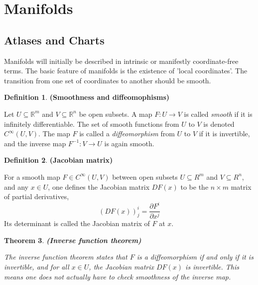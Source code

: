 \documentclass{article}
\newtheorem{theorem}{Theorem}[section]
\theoremstyle{definition}
\newtheorem{defn}[theorem]{Definition}
\newenvironment{definition}
  {\vspace{8pt}\begin{mdframed}[backgroundcolor=blueish]\begin{defn}}
  {\end{defn}\end{mdframed}\vspace{4pt}}
\begin{document}
\section{Manifolds}
\subsection{Atlases and Charts}

Manifolds will initially be described in intrinsic or manifestly  coordinate-free terms. The basic feature of manifolds is the existence of 'local coordinates'. The transition from one set of coordinates to another should be smooth.
\begin{definition} \textbf{(Smoothness and diffeomophisms)}

Let $U \subseteq \mathbb R^m$ and $V \subseteq \mathbb R^n$ be open subsets. A map $F : U \rightarrow V$ is called \textit{smooth} if it is infinitely differentiable. The set of smooth functions from $U$ to $V$ is denoted $C^{\infty}(U,V)$. The map $F$ is called a \textit{diffeomorphism} from $U$ to $V$ if it is invertible, and the inverse map $F^{-1}: V \rightarrow U$ is again smooth.
\end{definition}


\begin{definition} \textbf{(Jacobian matrix)}

For a smooth map $F \in C^{\infty}(U,V)$ between open subsets $U \subseteq R^m$ and $V \subseteq R^n$, and any $x \in U$, one defines the Jacobian matrix $DF(x)$ to be the $n \times m$ matrix of partial derivatives,
\[
    (DF(x))^i_j = \frac{\partial F^i}{\partial x^j}
\]
Its determinant is called the Jacobian matrix of $F$ at $x$.
\end{definition}

\begin{theorem} \textbf{(Inverse function theorem)}

The inverse function theorem states that $F$ is a diffeomorphism if and only if it is invertible, and for all $x \in U$, the Jacobian matrix $DF(x)$ is invertible. This means one does not actually have to check smoothness of the inverse map.
\end{theorem}
\end{document}
